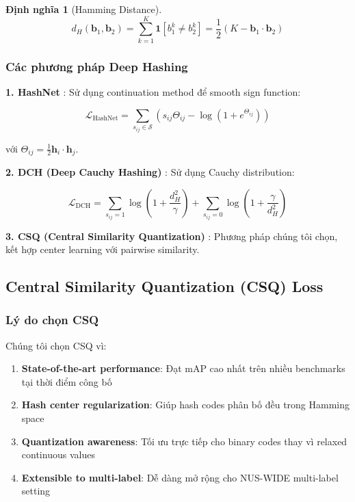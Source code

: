 \documentclass[12pt,a4paper]{article}
\newtheorem{definition}{Định nghĩa}[section]
\begin{document}
\begin{definition}[Hamming Distance]
\begin{equation}
    d_H(\mathbf{b}_1, \mathbf{b}_2) = \sum_{k=1}^{K} \mathbf{1}[b_1^k \neq b_2^k] = \frac{1}{2}(K - \mathbf{b}_1 \cdot \mathbf{b}_2)
\end{equation}
\end{definition}

\subsubsection{Các phương pháp Deep Hashing}

\textbf{1. HashNet} \cite{cao2017hashnet}: Sử dụng continuation method để smooth sign function:

\begin{equation}
    \mathcal{L}_{\text{HashNet}} = \sum_{s_{ij} \in \mathcal{S}} \left( s_{ij} \Theta_{ij} - \log(1 + e^{\Theta_{ij}}) \right)
\end{equation}

với $\Theta_{ij} = \frac{1}{2}\mathbf{h}_i \cdot \mathbf{h}_j$.

\textbf{2. DCH (Deep Cauchy Hashing)} \cite{cao2018dch}: Sử dụng Cauchy distribution:

\begin{equation}
    \mathcal{L}_{\text{DCH}} = \sum_{s_{ij}=1} \log\left(1 + \frac{d_H^2}{\gamma}\right) + \sum_{s_{ij}=0} \log\left(1 + \frac{\gamma}{d_H^2}\right)
\end{equation}

\textbf{3. CSQ (Central Similarity Quantization)} \cite{yuan2020csq}: Phương pháp chúng tôi chọn, kết hợp center learning với pairwise similarity.

\subsection{Central Similarity Quantization (CSQ) Loss}

\subsubsection{Lý do chọn CSQ}

Chúng tôi chọn CSQ \cite{yuan2020csq} vì:

\begin{enumerate}
    \item \textbf{State-of-the-art performance}: Đạt mAP cao nhất trên nhiều benchmarks tại thời điểm công bố
    \item \textbf{Hash center regularization}: Giúp hash codes phân bố đều trong Hamming space
    \item \textbf{Quantization awareness}: Tối ưu trực tiếp cho binary codes thay vì relaxed continuous values
    \item \textbf{Extensible to multi-label}: Dễ dàng mở rộng cho NUS-WIDE multi-label setting
\end{enumerate}
\end{document}
